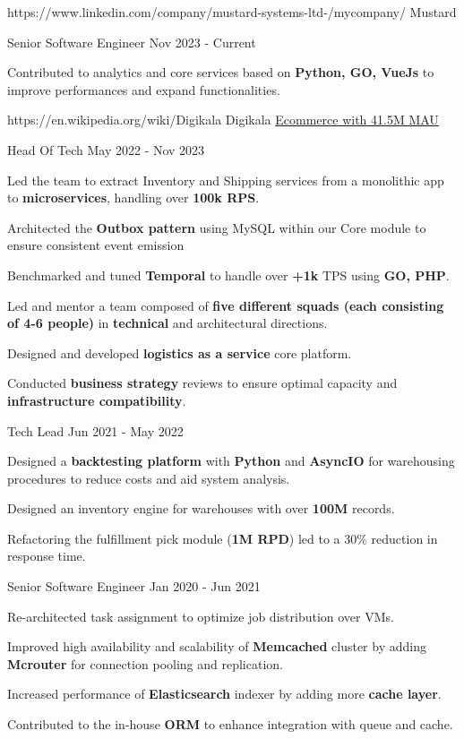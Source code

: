 \documentclass[
	10pt, %
]{FreemanCV}
\begin{document}
\begin{paracol}{2}

\company
{https://www.linkedin.com/company/mustard-systems-ltd-/mycompany/}
{Mustard}
{}
{}


\position
{Senior Software Engineer}
{Nov 2023 - Current}
{

	\item Contributed to analytics and core services based on \textbf{Python, GO, VueJs} to improve performances and expand functionalities.
}
\vspace{5pt}
\company
{https://en.wikipedia.org/wiki/Digikala}
{Digikala}
{\href{https://about.digikala.com/en/reports/digikala1401/}{Ecommerce with 41.5M MAU}}

\position
{Head Of Tech}
{May 2022 - Nov 2023}
{

	\item Led the team to extract Inventory and Shipping services from a monolithic app to \textbf{microservices}, handling over \textbf{100k RPS}.
	\item Architected the \textbf{Outbox pattern} using MySQL within our Core module to ensure consistent event emission
	\item Benchmarked and tuned \textbf{Temporal} to handle over \textbf{+1k} TPS using \textbf{GO, PHP}.
	\item Led and mentor a team composed of \textbf{five different squads (each consisting of 4-6 people)} in \textbf{technical} and architectural directions.
	\item Designed and developed \textbf{logistics as a service} core platform.
	\item Conducted \textbf{business strategy} reviews to ensure optimal capacity and 
	\textbf{infrastructure compatibility}.

}

\position
{Tech Lead}
{Jun 2021 - May 2022}
{
\item Designed a \textbf{backtesting platform} with \textbf{Python} and \textbf{AsyncIO} for warehousing procedures to reduce costs and aid system analysis.
\item Designed an inventory engine for warehouses with over \textbf{100M} records.
\item Refactoring the fulfillment pick module (\textbf{1M RPD}) led to a 30\% reduction in response time.
}

\position
{Senior Software Engineer}
{Jan 2020 - Jun 2021}
{
\item Re-architected task assignment to optimize job distribution over VMs.
\item Improved high availability and scalability of \textbf{Memcached} cluster by adding \textbf{Mcrouter} for connection pooling and replication.
\item Increased performance of \textbf{Elasticsearch} indexer by adding more \textbf{cache layer}.
\item Contributed to the in-house \textbf{ORM} to enhance integration with queue and cache.
}



\end{paracol}
\end{document}
